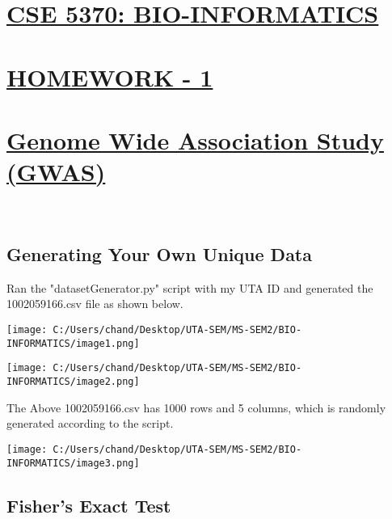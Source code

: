\documentclass[
]{article}
\author{}
\date{}
\begin{document}
\begin{center}

\hypertarget{cse-5370-bio-informatics}{%
\section{\texorpdfstring{\textbf{\uline{CSE 5370:
BIO-INFORMATICS}}}{CSE 5370: BIO-INFORMATICS}}\label{cse-5370-bio-informatics}}

\hypertarget{homework---1}{%
\section{\texorpdfstring{\textbf{\uline{HOMEWORK -
1}}}{HOMEWORK - 1}}\label{homework---1}}


\hypertarget{homework---1}{%
\section{\texorpdfstring{\textbf{\uline{Genome Wide Association Study (GWAS)}}}{Genome Wide Association Study (GWAS)}}\label{GWAS---1}}
\end{center}
\

\hypertarget{generating-your-own-unique-data}{%
\subsection{\texorpdfstring{\textbf{Generating Your Own Unique
Data}}{Generating Your Own Unique Data}}\label{generating-your-own-unique-data}}

Ran the "datasetGenerator.py" script with my UTA ID and generated the
1002059166.csv file as shown below.~

\texttt{[image: C:/Users/chand/Desktop/UTA-SEM/MS-SEM2/BIO-INFORMATICS/image1.png]}

\texttt{[image: C:/Users/chand/Desktop/UTA-SEM/MS-SEM2/BIO-INFORMATICS/image2.png]}

The Above 1002059166.csv has 1000 rows and 5 columns, which is randomly
generated according to the script.

\texttt{[image: C:/Users/chand/Desktop/UTA-SEM/MS-SEM2/BIO-INFORMATICS/image3.png]}

\hypertarget{fishers-exact-test}{%
\subsection{\texorpdfstring{\textbf{Fisher's Exact
Test}}{Fisher's Exact Test}}\label{fishers-exact-test}}
\end{document}
